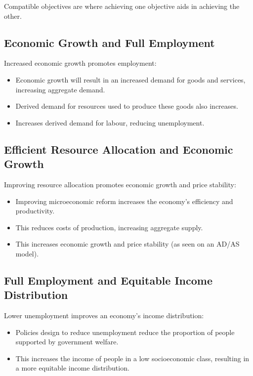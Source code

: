 \documentclass[a4paper,11pt]{report}
\begin{document}
Compatible objectives are where achieving one objective aids in achieving the
other.

\subsection{Economic Growth and Full Employment}

Increased economic growth promotes employment:

\begin{itemize}
\item Economic growth will result in an increased demand for goods and services,
	increasing aggregate demand.
\item Derived demand for resources used to produce these goods also increases.
\item Increases derived demand for labour, reducing unemployment.
\end{itemize}

\subsection{Efficient Resource Allocation and Economic Growth}

Improving resource allocation promotes economic growth and price stability:

\begin{itemize}
\item Improving microeconomic reform increases the economy's efficiency and
	productivity.
\item This reduces costs of production, increasing aggregate supply.
\item This increases economic growth and price stability (as seen on an AD/AS
	model).
\end{itemize}

\subsection{Full Employment and Equitable Income Distribution}

Lower unemployment improves an economy's income distribution:

\begin{itemize}
\item Policies design to reduce unemployment reduce the proportion of people
	supported by government welfare.
\item This increases the income of people in a low socioeconomic class,
	resulting in a more equitable income distribution.
\end{itemize}
\end{document}
